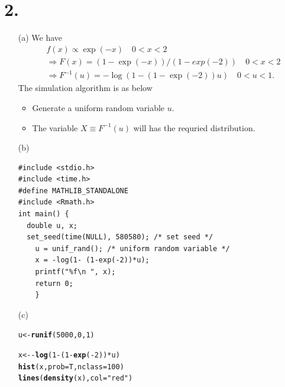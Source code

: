 \documentclass{article}\usepackage[]{graphicx}\usepackage[]{color}
\makeatletter
\newcommand{\hlnum}[1]{\textcolor[rgb]{0.686,0.059,0.569}{#1}}%
\newcommand{\hlstr}[1]{\textcolor[rgb]{0.192,0.494,0.8}{#1}}%
\newcommand{\hlopt}[1]{\textcolor[rgb]{0,0,0}{#1}}%
\newcommand{\hlstd}[1]{\textcolor[rgb]{0.345,0.345,0.345}{#1}}%
\newcommand{\hlkwb}[1]{\textcolor[rgb]{0.69,0.353,0.396}{#1}}%
\newcommand{\hlkwc}[1]{\textcolor[rgb]{0.333,0.667,0.333}{#1}}%
\newcommand{\hlkwd}[1]{\textcolor[rgb]{0.737,0.353,0.396}{\textbf{#1}}}%
\newenvironment{kframe}{%
 \def\at@end@of@kframe{}%
 \ifinner\ifhmode%
  \def\at@end@of@kframe{\end{minipage}}%
  \begin{minipage}{\columnwidth}%
 \fi\fi%
 \def\FrameCommand##1{\hskip\@totalleftmargin \hskip-\fboxsep
 \colorbox{shadecolor}{##1}\hskip-\fboxsep
     \hskip-\linewidth \hskip-\@totalleftmargin \hskip\columnwidth}%
 \MakeFramed {\advance\hsize-\width
   \@totalleftmargin\z@ \linewidth\hsize
   \@setminipage}}%
 {\par\unskip\endMakeFramed%
 \at@end@of@kframe}
\newenvironment{knitrout}{}{} %
\makeatother
\begin{document}
\section*{2.}
\begin{itemize}
\item[(a)] We have 
\begin{align*}
&f(x) \propto \exp(-x) \quad 0<x<2\\
& \Rightarrow F(x) = (1-\exp(-x))/(1-exp(-2)) \quad 0<x<2\\
& \Rightarrow F^{-1}(u) = -\log(1-(1-\exp(-2))u) \quad 0<u<1.
\end{align*}
The simulation algorithm is as below
\begin{itemize}
\item Generate a uniform random variable $u$.
\item The variable $X \equiv F^{-1}(u)$ will has the requried distribution.
\end{itemize}
\item[(b)]
\begin{verbatim}
#include <stdio.h>
#include <time.h>
#define MATHLIB_STANDALONE
#include <Rmath.h>
int main() {
  double u, x;
  set_seed(time(NULL), 580580); /* set seed */
    u = unif_rand(); /* uniform random variable */
    x = -log(1- (1-exp(-2))*u);
    printf("%f\n ", x);
    return 0;
    }
\end{verbatim}
\item[(c)]
\begin{knitrout}
\color{fgcolor}\begin{kframe}
\begin{alltt}
\hlstd{u} \hlkwb{<-} \hlkwd{runif}\hlstd{(}\hlnum{5000}\hlstd{,} \hlnum{0}\hlstd{,} \hlnum{1}\hlstd{)}

\hlstd{x} \hlkwb{<-} \hlopt{-}\hlkwd{log}\hlstd{(}\hlnum{1}\hlopt{-}\hlstd{(}\hlnum{1}\hlopt{-}\hlkwd{exp}\hlstd{(}\hlopt{-}\hlnum{2}\hlstd{))}\hlopt{*}\hlstd{u)}
\hlkwd{hist}\hlstd{(x,} \hlkwc{prob} \hlstd{= T,} \hlkwc{nclass} \hlstd{=} \hlnum{100}\hlstd{)}
\hlkwd{lines}\hlstd{(}\hlkwd{density}\hlstd{(x),} \hlkwc{col} \hlstd{=} \hlstr{"red"}\hlstd{)}
\end{alltt}
\end{kframe}


\end{knitrout}
\end{itemize}
\end{document}
